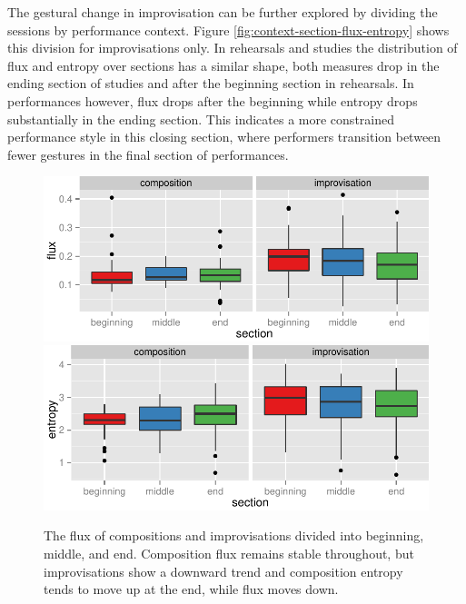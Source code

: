 \documentclass{sigchi}
\begin{document}
The gestural change in improvisation can be further explored by
dividing the sessions by performance context. Figure
\ref{fig:context-section-flux-entropy} shows this division for
improvisations only. In rehearsals and studies the distribution of
flux and entropy over sections has a similar shape, both measures drop
in the ending section of studies and after the beginning section in
rehearsals. In performances however, flux drops after the beginning
while entropy drops substantially in the ending section. This
indicates a more constrained performance style in this closing
section, where performers transition between fewer gestures in the
final section of performances.


\begin{figure}
  \centering
  \includegraphics[width=\linewidth]{figures/type-section-flux}
\includegraphics[width=\linewidth]{figures/type-section-entropy}
  \caption{The flux of compositions and improvisations divided into
    beginning, middle, and end. Composition flux remains stable throughout,
    but improvisations show a downward trend and composition entropy tends to move up
    at the end, while flux moves down.
    \label{fig:type-section-flux-entropy}}
\end{figure}
\end{document}
